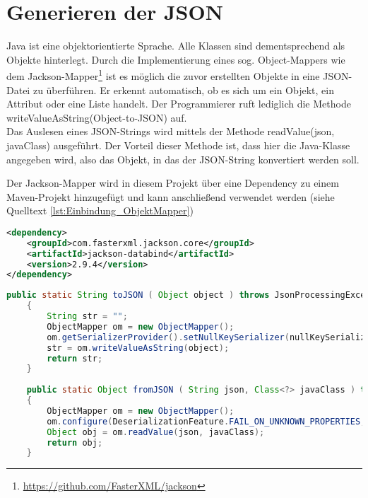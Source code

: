 \section{Generieren der \acf{JSON}}
\label{sec:json_generieren}
Java ist eine objektorientierte Sprache.
Alle Klassen sind dementsprechend als Objekte hinterlegt.
Durch die Implementierung eines sog. Object-Mappers wie dem Jackson-Mapper\footnote{\url{https://github.com/FasterXML/jackson}}
ist es möglich die zuvor erstellten Objekte in eine \acs{JSON}-Datei zu überführen.
Er erkennt automatisch, ob es sich um ein Objekt, ein Attribut oder eine Liste handelt.
Der Programmierer ruft lediglich die Methode writeValueAsString(Object-to-JSON) auf. \\
Das Auslesen eines \acs{JSON}-Strings wird mittels der Methode readValue(json, javaClass) ausgeführt.
Der Vorteil dieser Methode ist, dass hier die Java-Klasse angegeben wird, also das Objekt, in das der \acs{JSON}-String konvertiert werden soll.

Der Jackson-Mapper wird in diesem Projekt über eine Dependency zu einem Maven-Projekt hinzugefügt und kann anschließend verwendet werden (siehe Quelltext \ref{lst:Einbindung_ObjektMapper}) %

\begin{minipage}{\linewidth}
\begin{lstlisting}[language=XML]
<dependency>
	<groupId>com.fasterxml.jackson.core</groupId>
	<artifactId>jackson-databind</artifactId>
	<version>2.9.4</version>
</dependency>
\end{lstlisting}
\label{lst:Einbindung_ObjektMapper}
\end{minipage}

\begin{minipage}{\linewidth}
	\begin{lstlisting}[language=JAVA]
	public static String toJSON ( Object object ) throws JsonProcessingException
	{
		String str = "";
		ObjectMapper om = new ObjectMapper();
		om.getSerializerProvider().setNullKeySerializer(nullKeySerializer);
		str = om.writeValueAsString(object);
		return str;
	}
	
	public static Object fromJSON ( String json, Class<?> javaClass ) throws IOException
	{
		ObjectMapper om = new ObjectMapper();
		om.configure(DeserializationFeature.FAIL_ON_UNKNOWN_PROPERTIES, false);
		Object obj = om.readValue(json, javaClass);
		return obj;
	}
	\end{lstlisting}
\end{minipage}